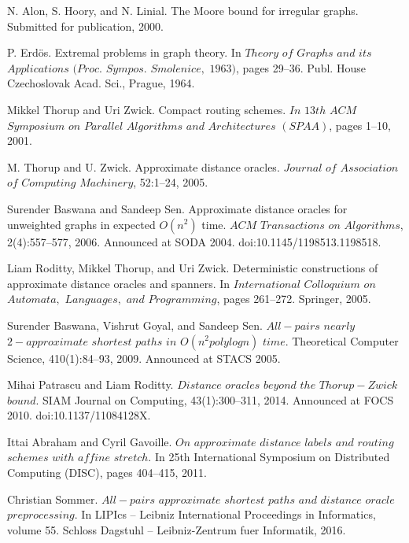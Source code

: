 \documentclass[shortabstract, lic, english]{iithesis}
\theoremstyle{definition} \newtheorem{definition}{Definition}[chapter]
\theoremstyle{remark} \newtheorem{remark}[definition]{Observation}
\theoremstyle{plain} \newtheorem{theorem}[definition]{Theorem}
\theoremstyle{plain} \newtheorem{lemma}[definition]{Lemma}
\theoremstyle{plain} \newtheorem{conjecture}[definition]{Conjecture}
\begin{document}
\begin{thebibliography}{1}
N. Alon, S. Hoory, and N. Linial. The Moore bound for irregular
graphs. Submitted for publication, 2000.

P. Erd{\"o}s. Extremal problems in graph theory. In $Theory$ $of$ $Graphs$
$and$ $its$ $Applications$ $(Proc.$ $Sympos.$ $Smolenice,$ $1963)$, pages 29–36.
Publ. House Czechoslovak Acad. Sci., Prague, 1964.

Mikkel Thorup and Uri Zwick. Compact routing schemes. $In$ $13th$ $ACM$ $Symposium$ $on$
$Parallel$ $Algorithms$ $and$ $Architectures$ $(SPAA)$, pages 1–10, 2001.

M. Thorup and U. Zwick. Approximate distance oracles. $Journal$ $of$ $Association$ $of$ $Computing$
$Machinery$, 52:1–24, 2005.

Surender Baswana and Sandeep Sen. Approximate distance oracles for unweighted graphs
in expected $O(n^2)$ time. $ACM$ $Transactions$ $on$ $Algorithms$, 2(4):557–577, 2006. Announced
at SODA 2004. doi:10.1145/1198513.1198518.

Liam Roditty, Mikkel Thorup, and Uri Zwick. Deterministic constructions of approximate
distance oracles and spanners. In $International$ $Colloquium$ $on$ $Automata,$ $Languages,$ $and$
$Programming$, pages 261–272. Springer, 2005.

Surender Baswana, Vishrut Goyal, and Sandeep Sen. $All-pairs$ $nearly$ $2-approximate$ $shortest$ 
$paths$ $in$ $O(n^2poly log n)$ $time.$ Theoretical Computer Science, 410(1):84–93, 2009. Announced at STACS 2005.

Mihai Patrascu and Liam Roditty. $Distance$ $oracles$ $beyond$ $the$ $Thorup-Zwick$ $bound.$
SIAM Journal on Computing, 43(1):300–311, 2014. Announced at FOCS 2010.
doi:10.1137/11084128X.

Ittai Abraham and Cyril Gavoille. $On$ $approximate$ $distance$ $labels$ $and$ $routing$ $schemes$
$with$ $affine$ $stretch.$ In 25th International Symposium on Distributed Computing (DISC),
pages 404–415, 2011.

Christian Sommer. $All-pairs$ $approximate$ $shortest$ $paths$ $and$ $distance$ $oracle$ $preprocessing.$
In LIPIcs – Leibniz International Proceedings in Informatics, volume 55. Schloss Dagstuhl
– Leibniz-Zentrum fuer Informatik, 2016.


\end{thebibliography}
\end{document}
